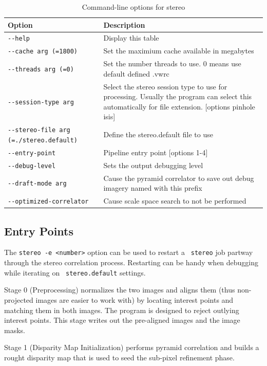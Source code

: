 \begin{longtable}{|l|p{10cm}|}
\caption{Command-line options for stereo}
\label{tbl:stereo}
\endfirsthead
\endhead
\endfoot
\endlastfoot
\hline
Option & Description \\ \hline \hline
\verb#--help# & Display this table\\ \hline
\verb#--cache arg (=1800)# & Set the maximium cache available in megabytes\\ \hline
\verb#--threads arg (=0)# & Set the number threads to use. 0 means use default defined .vwrc\\ \hline
\verb#--session-type arg# & Select the stereo session type to use for processing. Usually the program can select this automatically for file extension. [options pinhole isis]\\ \hline
\verb#--stereo-file arg (=./stereo.default)# & Define the stereo.default file to use\\ \hline
\verb#--entry-point# & Pipeline entry point [options 1-4]\\ \hline
\verb#--debug-level# & Sets the output debugging level\\ \hline
\verb#--draft-mode arg# & Cause the pyramid correlator to save out debug imagery named with this prefix\\ \hline
\verb#--optimized-correlator# & Cause scale space search to not be performed\\ \hline
\end{longtable}

\subsection{Entry Points}
\label{entrypoints}

The {\tt stereo -e <number>} option can be used to restart a {\tt
  stereo} job partway through the stereo correlation process.
Restarting can be handy when debugging while iterating on {\tt
  stereo.default} settings.

Stage 0 (Preprocessing) normalizes the two images and aligns them
(thus non-projected images are easier to work with) by locating
interest points and matching them in both images. The program is
designed to reject outlying interest points.  This stage writes out
the pre-aligned images and the image masks.

Stage 1 (Disparity Map Initialization) performs pyramid correlation and builds a rought disparity map that is used to seed the sub-pixel refinement phase.

